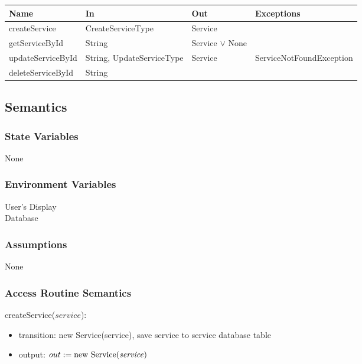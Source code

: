 \documentclass[12pt, titlepage]{article}
\begin{document}
\begin{center}
	\begin{adjustbox}{width=\textwidth}
		\begin{tabular}{llll}
			\hline
			\textbf{Name}     & \textbf{In}               & \textbf{Out}        & \textbf{Exceptions}      \\
			\hline
			createService     & CreateServiceType         & Service             & ~                        \\
			getServiceById    & String                    & Service $\lor$ None & ~                        \\
			updateServiceById & String, UpdateServiceType & Service             & ServiceNotFoundException \\
			deleteServiceById & String                    & ~                   & ~                        \\
			\hline
		\end{tabular}
	\end{adjustbox}
\end{center}

\subsection{Semantics}

\subsubsection{State Variables}

None

\subsubsection{Environment Variables}

User's Display \\ Database

\subsubsection{Assumptions}

None

\subsubsection{Access Routine Semantics}

\noindent createService($service$):
\begin{itemize}
	\item transition: new Service(service), save service to service database table
	\item output: $out := \text{new Service(\emph{service})}$
\end{itemize}
\end{document}
